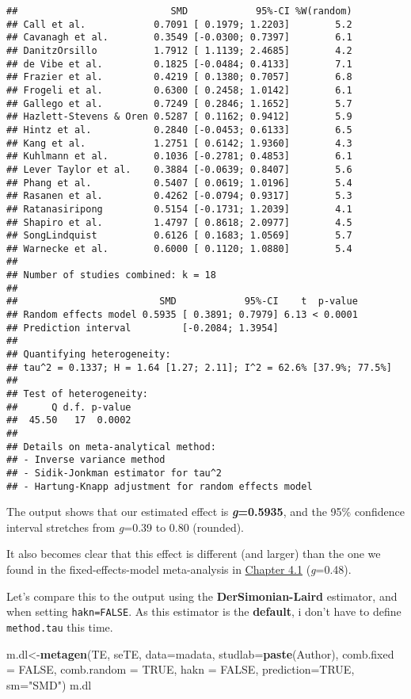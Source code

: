 \documentclass[]{book}
\newenvironment{Shaded}{\begin{snugshade}}{\end{snugshade}}
\newcommand{\KeywordTok}[1]{\textcolor[rgb]{0.13,0.29,0.53}{\textbf{#1}}}
\newcommand{\DataTypeTok}[1]{\textcolor[rgb]{0.13,0.29,0.53}{#1}}
\newcommand{\StringTok}[1]{\textcolor[rgb]{0.31,0.60,0.02}{#1}}
\newcommand{\OtherTok}[1]{\textcolor[rgb]{0.56,0.35,0.01}{#1}}
\newcommand{\NormalTok}[1]{#1}
\theoremstyle{definition}
\theoremstyle{definition}
\theoremstyle{definition}
\theoremstyle{remark}
\begin{document}
\begin{verbatim}
##                           SMD            95%-CI %W(random)
## Call et al.            0.7091 [ 0.1979; 1.2203]        5.2
## Cavanagh et al.        0.3549 [-0.0300; 0.7397]        6.1
## DanitzOrsillo          1.7912 [ 1.1139; 2.4685]        4.2
## de Vibe et al.         0.1825 [-0.0484; 0.4133]        7.1
## Frazier et al.         0.4219 [ 0.1380; 0.7057]        6.8
## Frogeli et al.         0.6300 [ 0.2458; 1.0142]        6.1
## Gallego et al.         0.7249 [ 0.2846; 1.1652]        5.7
## Hazlett-Stevens & Oren 0.5287 [ 0.1162; 0.9412]        5.9
## Hintz et al.           0.2840 [-0.0453; 0.6133]        6.5
## Kang et al.            1.2751 [ 0.6142; 1.9360]        4.3
## Kuhlmann et al.        0.1036 [-0.2781; 0.4853]        6.1
## Lever Taylor et al.    0.3884 [-0.0639; 0.8407]        5.6
## Phang et al.           0.5407 [ 0.0619; 1.0196]        5.4
## Rasanen et al.         0.4262 [-0.0794; 0.9317]        5.3
## Ratanasiripong         0.5154 [-0.1731; 1.2039]        4.1
## Shapiro et al.         1.4797 [ 0.8618; 2.0977]        4.5
## SongLindquist          0.6126 [ 0.1683; 1.0569]        5.7
## Warnecke et al.        0.6000 [ 0.1120; 1.0880]        5.4
## 
## Number of studies combined: k = 18
## 
##                         SMD            95%-CI    t  p-value
## Random effects model 0.5935 [ 0.3891; 0.7979] 6.13 < 0.0001
## Prediction interval         [-0.2084; 1.3954]              
## 
## Quantifying heterogeneity:
## tau^2 = 0.1337; H = 1.64 [1.27; 2.11]; I^2 = 62.6% [37.9%; 77.5%]
## 
## Test of heterogeneity:
##      Q d.f. p-value
##  45.50   17  0.0002
## 
## Details on meta-analytical method:
## - Inverse variance method
## - Sidik-Jonkman estimator for tau^2
## - Hartung-Knapp adjustment for random effects model
\end{verbatim}

The output shows that our estimated effect is \textbf{\emph{g}=0.5935},
and the 95\% confidence interval stretches from \emph{g}=0.39 to 0.80
(rounded).

It also becomes clear that this effect is different (and larger) than
the one we found in the fixed-effects-model meta-analysis in
\protect\hyperlink{fixed}{Chapter 4.1} (\emph{g}=0.48).

Let's compare this to the output using the \textbf{DerSimonian-Laird}
estimator, and when setting \texttt{hakn=FALSE}. As this estimator is
the \textbf{default}, i don't have to define \texttt{method.tau} this
time.

\begin{Shaded}
\begin{Highlighting}[]
\NormalTok{m.dl<-}\KeywordTok{metagen}\NormalTok{(TE,}
\NormalTok{        seTE,}
        \DataTypeTok{data=}\NormalTok{madata,}
        \DataTypeTok{studlab=}\KeywordTok{paste}\NormalTok{(Author),}
        \DataTypeTok{comb.fixed =} \OtherTok{FALSE}\NormalTok{,}
        \DataTypeTok{comb.random =} \OtherTok{TRUE}\NormalTok{,}
        \DataTypeTok{hakn =} \OtherTok{FALSE}\NormalTok{,}
        \DataTypeTok{prediction=}\OtherTok{TRUE}\NormalTok{,}
        \DataTypeTok{sm=}\StringTok{"SMD"}\NormalTok{)}
\NormalTok{m.dl}
\end{Highlighting}
\end{Shaded}
\end{document}
